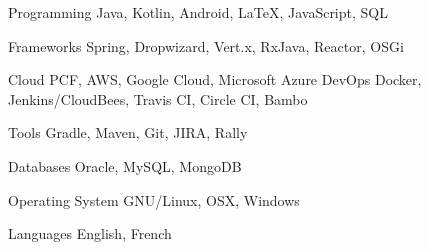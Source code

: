 

\begin{cvskills}

  \cvskill
    {Programming} %
    {Java, Kotlin, Android, \LaTeX, JavaScript, SQL} %

  \cvskill
    {Frameworks} %
    {Spring, Dropwizard, Vert.x, RxJava, Reactor, OSGi} %

  \cvskill
    {Cloud} %
    {PCF, AWS, Google Cloud, Microsoft Azure} %
  \cvskill
    {DevOps} %
    {Docker, Jenkins/CloudBees, Travis CI, Circle CI, Bambo} %

  \cvskill
    {Tools} %
    {Gradle, Maven, Git, JIRA, Rally} %

  \cvskill
    {Databases} %
    {Oracle, MySQL, MongoDB} %

  \cvskill
    {Operating System} %
    {GNU/Linux, OSX, Windows} %

  \cvskill
    {Languages} %
    {English, French} %

\end{cvskills}
